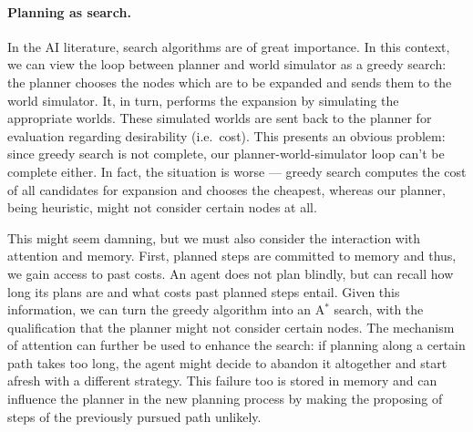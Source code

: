 \paragraph{Planning as search.} In the AI literature, search algorithms are of great importance. In this context, we can view the loop between planner and world simulator as a greedy search: the planner chooses the nodes which are to be expanded and sends them to the world simulator. It, in turn, performs the expansion by simulating the appropriate worlds. These simulated worlds are sent back to the planner for evaluation regarding desirability (i.e.\ cost). This presents an obvious problem: since greedy search is not complete, our planner-world-simulator loop can't be complete either. In fact, the situation is worse --- greedy search computes the cost of all candidates for expansion and chooses the cheapest, whereas our planner, being heuristic, might not consider certain nodes at all.

This might seem damning, but we must also consider the interaction with attention and memory. First, planned steps are committed to memory and thus, we gain access to past costs. An agent does not plan blindly, but can recall how long its plans are and what costs past planned steps entail. Given this information, we can turn the greedy algorithm into an A$^*$ search, with the qualification that the planner might not consider certain nodes. The mechanism of attention can further be used to enhance the search: if planning along a certain path takes too long, the agent might decide to abandon it altogether and start afresh with a different strategy. This failure too is stored in memory and can influence the planner in the new planning process by making the proposing of steps of the previously pursued path  unlikely.